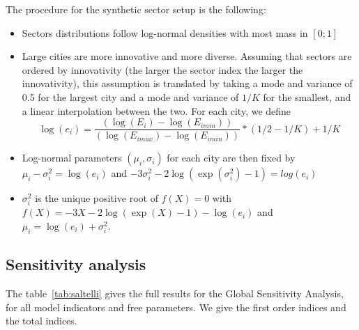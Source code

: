 The procedure for the synthetic sector setup is the following:
\begin{itemize}
    \item Sectors distributions follow log-normal densities with most mass in $\left[0;1\right]$
    \item Large cities are more innovative and more diverse. Assuming that sectors are ordered by innovativity (the larger the sector index the larger the innovativity), this assumption is translated by taking a mode and variance of 0.5 for the largest city and a mode and variance of $1/K$ for the smallest, and a linear interpolation between the two. For each city, we define
    \[
    \log(e_i) = \frac{(\log(E_i) - \log(E_{imin}))}{(\log(E_{imax}) - \log(E_{imin}))} * (1/2 - 1/K) + 1/K
    \]
    \item Log-normal parameters $(\mu_i,\sigma_i)$ for each city are then fixed by $\mu_i - \sigma_i^2 = \log(e_i)$ and $-3 \sigma_i^2 - 2 \log(\exp(\sigma_i^2) - 1) = log(e_i)$
    \item $\sigma_i^2$ is the unique positive root of $f(X)=0$ with $f(X) = -3X - 2 \log(\exp(X) - 1) - \log(e_i)$ and $\mu_i = \log(e_i) + \sigma_i^2$.
\end{itemize}






\subsection*{Sensitivity analysis}

The table~\ref{tab:saltelli} gives the full results for the Global Sensitivity Analysis, for all model indicators and free parameters. We give the first order indices and the total indices.

